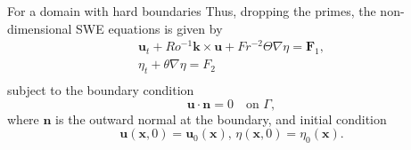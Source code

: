 For a domain with hard boundaries
Thus, dropping the primes, the non-dimensional SWE equations is given by 
\begin{equation}
  \begin{split}
    \mathbf{u}_{t} + Ro^{-1} \mathbf{k}\times\mathbf{u} 
        + Fr^{-2} \Theta \nabla \eta = \mathbf{F}_1, \\
    \eta_{t} + \theta \nabla \eta = F_2 \\
  \end{split}
  \label{eqn:SWE}
\end{equation}
subject to the boundary condition
\begin{equation}
  \mathbf{u}\cdot \mathbf{n} = 0 \quad \text{on } \Gamma,
  \label{eqn:BCs}
\end{equation}
where $\mathbf{n}$ is the outward normal at the boundary,
and initial condition
\begin{equation}
  \mathbf{u}(\mathbf{x},0) = \mathbf{u}_0(\mathbf{x}),\, \eta(\mathbf{x},0) =
    \eta_0(\mathbf{x}).
  \label{eqn:IC}
\end{equation}

